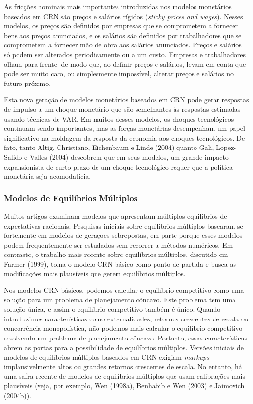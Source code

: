 \documentclass[12pt]{article}
\begin{document}
As fricções nominais mais importantes introduzidas nos modelos monetários baseados em CRN são preços e salários rígidos (\textit{sticky prices and wages}). Nesses modelos, os preços são definidos por empresas que se comprometem a fornecer bens aos preços anunciados, e os salários são definidos por trabalhadores que se comprometem a fornecer mão de obra aos salários anunciados. Preços e salários só podem ser alterados periodicamente ou a um custo. Empresas e trabalhadores olham para frente, de modo que, ao definir preços e salários, levam em conta que pode ser muito caro, ou simplesmente impossível, alterar preços e salários no futuro próximo.

Esta nova geração de modelos monetários baseados em CRN pode gerar respostas de impulso a um choque monetário que são semelhantes às respostas estimadas usando técnicas de VAR. Em muitos desses modelos, os choques tecnológicos continuam sendo importantes, mas as forças monetárias desempenham um papel significativo na moldagem da resposta da economia aos choques tecnológicos. De fato, tanto Altig, Christiano, Eichenbaum e Linde (2004) quanto Gali, Lopez-Salido e Valles (2004) descobrem que em seus modelos, um grande impacto expansionista de curto prazo de um choque tecnológico requer que a política monetária seja acomodatícia.

\subsubsection*{Modelos de Equilíbrios Múltiplos}

Muitos artigos examinam modelos que apresentam múltiplos equilíbrios de expectativas racionais. Pesquisas iniciais sobre equilíbrios múltiplos basearam-se fortemente em modelos de gerações sobrepostas, em parte porque esses modelos podem frequentemente ser estudados sem recorrer a métodos numéricos. Em contraste, o trabalho mais recente sobre equilíbrios múltiplos, discutido em Farmer (1999), toma o modelo CRN básico como ponto de partida e busca as modificações mais plausíveis que gerem equilíbrios múltiplos.

Nos modelos CRN básicos, podemos calcular o equilíbrio competitivo como uma solução para um problema de planejamento côncavo. Este problema tem uma solução única, e assim o equilíbrio competitivo também é único. Quando introduzimos características como externalidades, retornos crescentes de escala ou concorrência monopolística, não podemos mais calcular o equilíbrio competitivo resolvendo um problema de planejamento côncavo. Portanto, essas características abrem as portas para a possibilidade de equilíbrios múltiplos. Versões iniciais de modelos de equilíbrios múltiplos baseados em CRN exigiam \textit{markups} implausivelmente altos ou grandes retornos crescentes de escala. No entanto, há uma safra recente de modelos de equilíbrios múltiplos que usam calibrações mais plausíveis (veja, por exemplo, Wen (1998a), Benhabib e Wen (2003) e Jaimovich (2004b)).
\end{document}
